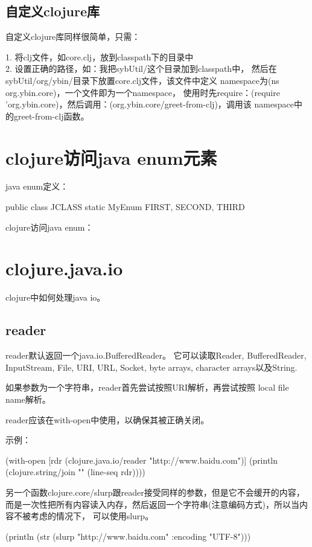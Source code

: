 ﻿\documentclass[a4paper,11pt]{article}
\begin{document}
  \subsection[自定义clojure库]{自定义clojure库}
  自定义clojure库同样很简单，只需：

  1. 将clj文件，如core.clj，放到classpath下的目录中\\
  2. 设置正确的路径，如：我把sybUtil/这个目录加到classpath中，
  然后在sybUtil/org/ybin/目录下放置core.clj文件，该文件中定义
  namespace为(ns org.ybin.core)，一个文件即为一个namespace，
  使用时先require：(require 'org.ybin.core)，然后调用：(org.ybin.core/greet-from-clj)，调用该
  namespace中的greet-from-clj函数。

  \section[clojure访问java enum元素]{clojure访问java enum元素}
  java enum定义：\par
  \begin{javacode}
public class JCLASS {
  static MyEnum {
    FIRST,
    SECOND,
    THIRD
  }
}
  \end{javacode}

  clojure访问java enum：\par


  \section[clojure.java.io]{clojure.java.io}
  clojure中如何处理java io。
  \subsection[reader]{reader}
  reader默认返回一个java.io.BufferedReader。
  它可以读取Reader, BufferedReader, InputStream, File,
  URI, URL, Socket, byte arrays, character arrays以及String.

  如果参数为一个字符串，reader首先尝试按照URI解析，再尝试按照
  local file name解析。

  reader应该在with-open中使用，以确保其被正确关闭。

  示例：\\
  \begin{schemecode}
    (with-open [rdr (clojure.java.io/reader "http://www.baidu.com")]
      (println (clojure.string/join "\n" (line-seq rdr))))
  \end{schemecode}

  另一个函数clojure.core/slurp跟reader接受同样的参数，但是它不会缓开的内容，
  而是一次性把所有内容读入内存，然后返回一个字符串(注意编码方式)，所以当内容不被考虑的情况下，
  可以使用slurp。
  
  \begin{schemecode}
    (println (str (slurp "http://www.baidu.com" :encoding "UTF-8")))
  \end{schemecode}

  
\end{document}
